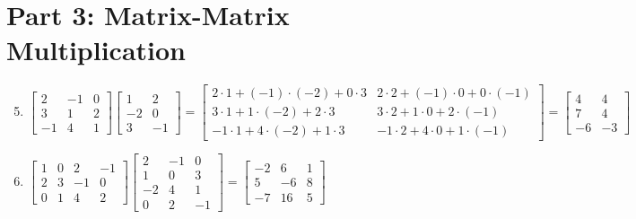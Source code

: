 \documentclass{article}
\begin{document}
\section*{Part 3: Matrix-Matrix Multiplication}
\begin{enumerate}
\setcounter{enumi}{4}
\item $\begin{bmatrix} 2 & -1 & 0 \\ 3 & 1 & 2 \\ -1 & 4 & 1 \end{bmatrix} \begin{bmatrix} 1 & 2 \\ -2 & 0 \\ 3 & -1 \end{bmatrix} = \begin{bmatrix}
2\cdot1+(-1)\cdot(-2)+0\cdot3 & 2\cdot2+(-1)\cdot0+0\cdot(-1) \\
3\cdot1+1\cdot(-2)+2\cdot3 & 3\cdot2+1\cdot0+2\cdot(-1) \\
-1\cdot1+4\cdot(-2)+1\cdot3 & -1\cdot2+4\cdot0+1\cdot(-1) \end{bmatrix} = \boxed{\begin{bmatrix} 4 & 4 \\ 7 & 4 \\ -6 & -3 \end{bmatrix}}$

\item $\begin{bmatrix} 1 & 0 & 2 & -1 \\ 2 & 3 & -1 & 0 \\ 0 & 1 & 4 & 2 \end{bmatrix} \begin{bmatrix} 2 & -1 & 0 \\ 1 & 0 & 3 \\ -2 & 4 & 1 \\ 0 & 2 & -1 \end{bmatrix} = \boxed{\begin{bmatrix}
-2 & 6 & 1 \\
5 & -6 & 8 \\
-7 & 16 & 5 \end{bmatrix}}$
\end{enumerate}
\end{document}
